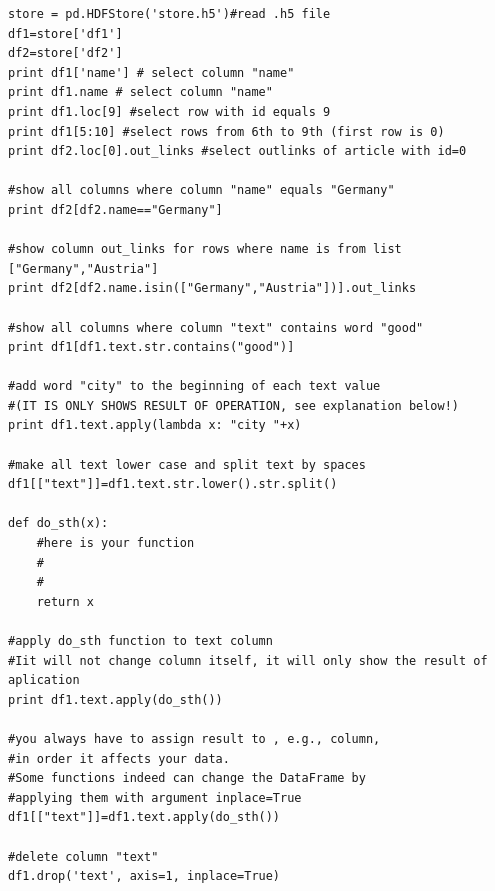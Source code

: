 \documentclass{WeSTassignment}
\begin{document}
\begin{enumerate}
\begin{verbatim}
store = pd.HDFStore('store.h5')#read .h5 file
df1=store['df1'] 
df2=store['df2'] 
print df1['name'] # select column "name"
print df1.name # select column "name"
print df1.loc[9] #select row with id equals 9 
print df1[5:10] #select rows from 6th to 9th (first row is 0) 
print df2.loc[0].out_links #select outlinks of article with id=0 

#show all columns where column "name" equals "Germany"
print df2[df2.name=="Germany"]

#show column out_links for rows where name is from list ["Germany","Austria"]
print df2[df2.name.isin(["Germany","Austria"])].out_links 

#show all columns where column "text" contains word "good" 
print df1[df1.text.str.contains("good")]

#add word "city" to the beginning of each text value 
#(IT IS ONLY SHOWS RESULT OF OPERATION, see explanation below!)
print df1.text.apply(lambda x: "city "+x)

#make all text lower case and split text by spaces
df1[["text"]]=df1.text.str.lower().str.split()

def do_sth(x):
	#here is your function
	#
	#
	return x
    
#apply do_sth function to text column 
#Iit will not change column itself, it will only show the result of aplication	 	
print df1.text.apply(do_sth())

#you always have to assign result to , e.g., column, 
#in order it affects your data.
#Some functions indeed can change the DataFrame by 
#applying them with argument inplace=True
df1[["text"]]=df1.text.apply(do_sth())  

#delete column "text"
df1.drop('text', axis=1, inplace=True)
\end{verbatim}

\end{enumerate}







\makefooter
\end{document}
